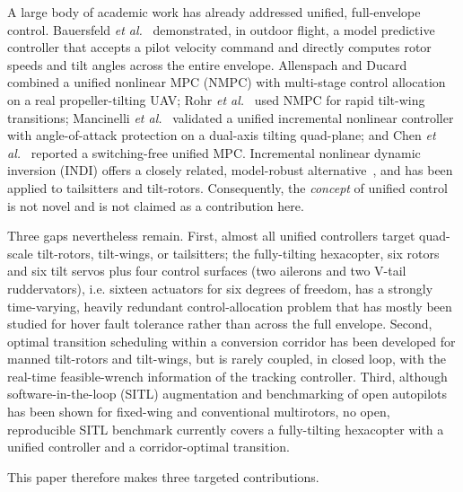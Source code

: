 \documentclass[preprint,3p,11pt]{elsarticle}
\begin{document}
A large body of academic work has already addressed unified, full-envelope
control. Bauersfeld \emph{et al.}~\cite{bauersfeld2021mpc} demonstrated, in
outdoor flight, a model predictive controller that accepts a pilot velocity
command and directly computes rotor speeds and tilt angles across the entire
envelope. Allenspach and Ducard~\cite{allenspach2021nmpc} combined a unified
nonlinear MPC (NMPC) with multi-stage control allocation on a real
propeller-tilting UAV; Rohr \emph{et al.}~\cite{rohr2021nmpc} used NMPC for
rapid tilt-wing transitions; Mancinelli \emph{et al.}~\cite{mancinelli2025unified}
validated a unified incremental nonlinear controller with angle-of-attack
protection on a dual-axis tilting quad-plane; and Chen \emph{et
al.}~\cite{chen2024unified} reported a switching-free unified MPC. Incremental
nonlinear dynamic inversion (INDI) offers a closely related, model-robust
alternative~\cite{smeur2020incremental,smeur2018cascaded,smeur2016adaptive,wang2019stability},
and has been applied to tailsitters and tilt-rotors. Consequently, the
\emph{concept} of unified control is not novel and is not claimed as a
contribution here.

Three gaps nevertheless remain. First, almost all unified controllers target
quad-scale tilt-rotors, tilt-wings, or tailsitters; the fully-tilting
hexacopter, six rotors and six tilt servos plus four control surfaces (two
ailerons and two V-tail ruddervators), i.e. sixteen actuators for six degrees
of freedom, has a strongly time-varying,
heavily redundant control-allocation problem that has mostly been studied for
hover fault tolerance rather than across the full envelope. Second, optimal
transition scheduling within a conversion corridor has been developed for
manned tilt-rotors and tilt-wings, but is rarely coupled, in closed loop, with
the real-time feasible-wrench information of the tracking controller. Third,
although software-in-the-loop (SITL) augmentation and benchmarking of open
autopilots has been shown for fixed-wing and conventional multirotors, no
open, reproducible SITL benchmark currently covers a fully-tilting hexacopter
with a unified controller and a corridor-optimal transition.

This paper therefore makes three targeted contributions.
\end{document}
